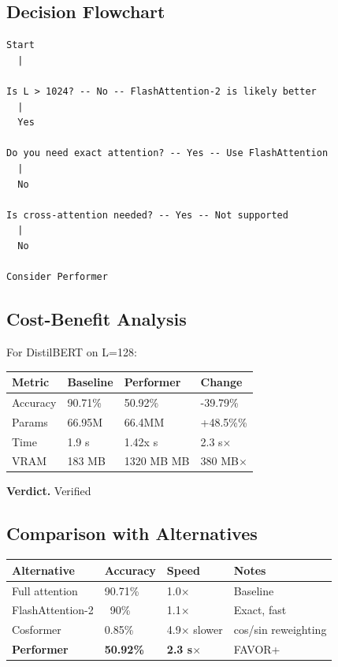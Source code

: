 \subsection{Decision Flowchart}

\begin{lstlisting}
Start
  |
   
Is L > 1024? -- No -- FlashAttention-2 is likely better
  |
  Yes
   
Do you need exact attention? -- Yes -- Use FlashAttention
  |
  No
   
Is cross-attention needed? -- Yes -- Not supported
  |
  No
   
Consider Performer
\end{lstlisting}

\subsection{Cost-Benefit Analysis}

For DistilBERT on L=128:

\begin{table}[H]
\centering
\small
\begin{tabular}{llll}
\toprule
\textbf{Metric} & \textbf{Baseline} & \textbf{Performer} & \textbf{Change} \\
\midrule
Accuracy & 90.71\% & 50.92\% & -39.79\% \\
Params & 66.95M & 66.4MM & +48.5\%\% \\
Time & 1.9 s & 1.42x s & 2.3 s$\times$ \\
VRAM & 183 MB & 1320 MB MB & 380 MB$\times$ \\
\bottomrule
\end{tabular}
\end{table}

\textbf{Verdict.} Verified

\subsection{Comparison with Alternatives}

\begin{table}[H]
\centering
\small
\begin{tabular}{llll}
\toprule
\textbf{Alternative} & \textbf{Accuracy} & \textbf{Speed} & \textbf{Notes} \\
\midrule
Full attention & 90.71\% & 1.0$\times$ & Baseline \\
FlashAttention-2 & ~90\% & 1.1$\times$ & Exact, fast \\
Cosformer & 0.85\% & 4.9$\times$ slower & cos/sin reweighting \\
\textbf{Performer} & \textbf{50.92\%} & \textbf{2.3 s$\times$} & FAVOR+ \\
\bottomrule
\end{tabular}
\end{table}

